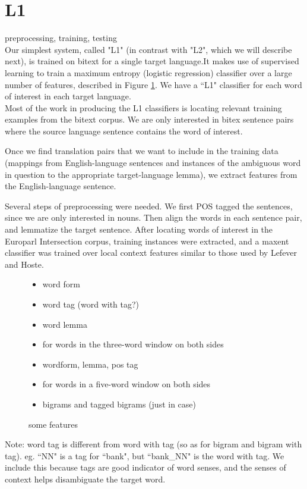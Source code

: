 \documentclass[11pt,letterpaper]{article}
\begin{document}
\section{L1}
preprocessing, training, testing\\
Our simplest system, called "L1" (in contrast with "L2", which we will describe
next), is trained on bitext for a single target language.It makes use of supervised learning to train a maximum entropy (logistic
regression) classifier over a large number of features, described in Figure
\ref{features}. 
We have a ``L1" classifier for each word of interest in each target language.\\  

Most of the work in producing the L1 classifiers is locating relevant training
examples from the bitext corpus. We are only interested in bitex sentence pairs where the source language sentence contains the word of interest.

Once we find translation pairs that we want to include in the training data
(mappings from English-language sentences and instances of the ambiguous word
in question to the appropriate target-language lemma), we extract features from
the English-language sentence. 

Several steps of preprocessing were needed. We first POS tagged the sentences, since we are only interested in nouns.
Then align the words in each sentence pair, and lemmatize the target sentence.
After locating words of interest in the
Europarl Intersection corpus, training instances were extracted, and a maxent
classifier was trained over local context features similar to those used by Lefever and
Hoste.

\begin{figure}
  \begin{itemize}
  \item word form
  \item word tag (word with tag?)
  \item word lemma
  \item for words in the three-word window on both sides
  \item wordform, lemma, pos tag
  \item for words in a five-word window on both sides
  \item bigrams and tagged bigrams (just in case)
  \end{itemize}
  \label{features}
  \caption{some features}
\end{figure}

Note: word tag is different from word with tag (so as for bigram and bigram with tag). eg. ``NN" is a tag for ``bank", but ``bank_NN" is the word with tag. We include this because tags are good indicator of word senses, and the senses of context helps disambiguate the target word. 
\end{document}
